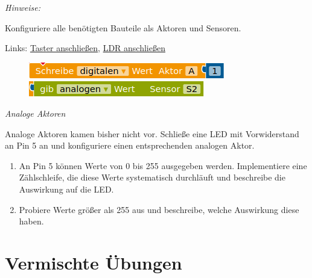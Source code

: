 \begin{minipage}{0.6\textwidth}
	\emph{Hinweise:}
	
	Konfiguriere alle benötigten Bauteile als Aktoren und Sensoren.
	
	\medskip
	\footnotesize%
	Links: \quad \zurueck \hyperref[abb:schaltplan-taster]{Taster anschließen}, \quad \zurueck \hyperref[abb:schaltplan-ldr]{LDR anschließen}
\end{minipage}
\hfill
\begin{minipage}{0.38\textwidth}
	\begin{figure}[H]
		\centering
		\includegraphics[width=0.9\linewidth]{./pics/aktor-ansteuern.png}
		\includegraphics[width=0.9\linewidth]{./pics/sensor-auslesen.png}
	\end{figure}
\end{minipage}

\vspace{3\baselineskip}
\begin{aufgabe} \emph{Analoge Aktoren}
	
	Analoge Aktoren kamen bisher nicht vor. Schließe eine LED mit Vorwiderstand an Pin 5 an und konfiguriere einen entsprechenden analogen Aktor.
	
	\begin{enumerate}[label=\alph*), itemsep=0ex, parsep=0ex]
		\item An Pin 5 können Werte von 0 bis 255 ausgegeben werden. Implementiere eine Zählschleife, die diese Werte systematisch durchläuft und beschreibe die Auswirkung auf die LED.
		\item Probiere Werte größer als 255 aus und beschreibe, welche Auswirkung diese haben.
	\end{enumerate}
\end{aufgabe}


\newpage
\section{Vermischte Übungen}
\label{sec:algo-uebungen}

% 

